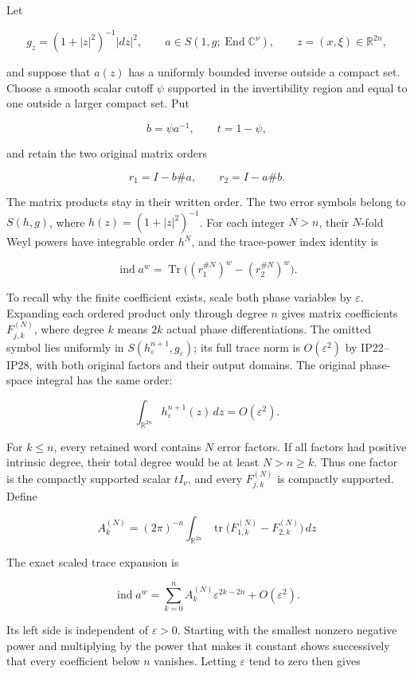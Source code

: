 \documentclass[
  11pt,
]{article}
\begin{document}
Let

\[
 g_z=(1+|z|^2)^{-1}|dz|^2,
 \qquad
 a\in S(1,g;\operatorname{End}\mathbb C^\nu),
 \qquad z=(x,\xi)\in\mathbb R^{2n},
\]

and suppose that \(a(z)\) has a uniformly bounded inverse outside a
compact set. Choose a smooth scalar cutoff \(\psi\) supported in the
invertibility region and equal to one outside a larger compact set. Put

\[
 b=\psi a^{-1},\qquad t=1-\psi,
\]

and retain the two original matrix orders

\[
 r_1=I-b\# a,\qquad r_2=I-a\# b.
 \tag{1}
\]

The matrix products stay in their written order. The two error symbols
belong to \(S(h,g)\), where \(h(z)=(1+|z|^2)^{-1}\). For each integer
\(N>n\), their \(N\)-fold Weyl powers have integrable order \(h^N\), and
the trace-power index identity is

\[
 \operatorname{ind}a^w
   =\operatorname{Tr}\bigl((r_1^{\#N})^w-(r_2^{\#N})^w\bigr).
 \tag{2}
\]

To recall why the finite coefficient exists, scale both phase variables
by \(\varepsilon\). Expanding each ordered product only through degree
\(n\) gives matrix coefficients \(F_{j,k}^{(N)}\), where degree \(k\)
means \(2k\) actual phase differentiations. The omitted symbol lies
uniformly in \(S(h_\varepsilon^{n+1},g_\varepsilon)\); its full trace
norm is \(O(\varepsilon^2)\) by IP22--IP28, with both original factors
and their output domains. The original phase-space integral has the same
order:

\[
 \int_{\mathbb R^{2n}}h_\varepsilon^{n+1}(z)\,dz
   =O(\varepsilon^2).
\]

For \(k\leq n\), every retained word contains \(N\) error factors. If
all factors had positive intrinsic degree, their total degree would be
at least \(N>n\geq k\). Thus one factor is the compactly supported
scalar \(tI_\nu\), and every \(F_{j,k}^{(N)}\) is compactly supported.
Define

\[
 A_k^{(N)}=(2\pi)^{-n}\int_{\mathbb R^{2n}}
  \operatorname{tr}\bigl(F_{1,k}^{(N)}-F_{2,k}^{(N)}\bigr)\,dz
 \tag{3}
\]

The exact scaled trace expansion is

\[
 \operatorname{ind}a^w
   =\sum_{k=0}^{n}A_k^{(N)}\varepsilon^{2k-2n}
      +O(\varepsilon^2).
\]

Its left side is independent of \(\varepsilon>0\). Starting with the
smallest nonzero negative power and multiplying by the power that makes
it constant shows successively that every coefficient below \(n\)
vanishes. Letting \(\varepsilon\) tend to zero then gives
\end{document}
